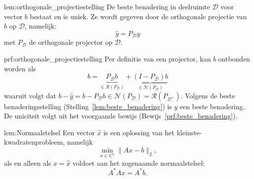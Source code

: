 \begin{lem}{lem:orthogonale_projectiestelling}
    \vspace{-0.1cm}
    De beste benadering in deelruimte $\mathcal{D}$ voor vector $b$ bestaat en is uniek. Ze wordt gegeven door de orthogonale projectie van $b$ op $\mathcal{D}$, namelijk:
    \begin{equation*}
        \hat{y} = P_{\mathcal{D}}y
    \end{equation*}
    met $P_{\mathcal{D}}$ de orthogonale projector op $\mathcal{D}$.
    \vspace{-0.1cm}
\end{lem}

\begin{prf}{prf:orthogonale_projectiestelling}
    \vspace{-0.1cm}
    Per definitie van een projector, kan $b$ ontbonden worden als
    \begin{equation*}
        b = \underbrace{P_{\mathcal{D}}b}_{\in \mathcal{R}(P_{\mathcal{D}})} + \underbrace{(I - P_{\mathcal{D}})b}_{\in \mathcal{N}(P_{\mathcal{D}})}
    \end{equation*}
    waaruit volgt dat $b - \hat{y} = b - P_{\mathcal{D}}b \in \mathcal{N}(P_{\mathcal{D}}) = \mathcal{R}(P_{\mathcal{D}^\perp})$. Volgens de beste benaderingsstelling (Stelling~\ref{lem:beste_benadering}) is $\hat{y}$ een beste benadering. De uniciteit volgt uit het voorgaande bewijs (Bewijs~\ref{prf:beste_benadering}).
    \vspace{-0.1cm}
\end{prf}

\begin{lem}[Normaalstelsel]{lem:Normaalstelsel}
    \vspace{-0.1cm}
    Een vector $\hat{x}$ is een oplossing van het kleinste-kwadratenprobleem, namelijk
    \begin{equation*}
        \min_{x \in \mathbb{C}^n} \|Ax-b\|_2,
    \end{equation*}
    als en alleen als $x = \hat{x}$ voldoet aan het zogenaamde normaalstelsel:
    \begin{equation*}
        A^*Ax = A^*b.
    \end{equation*}
    \vspace{-0.7cm}
\end{lem}

